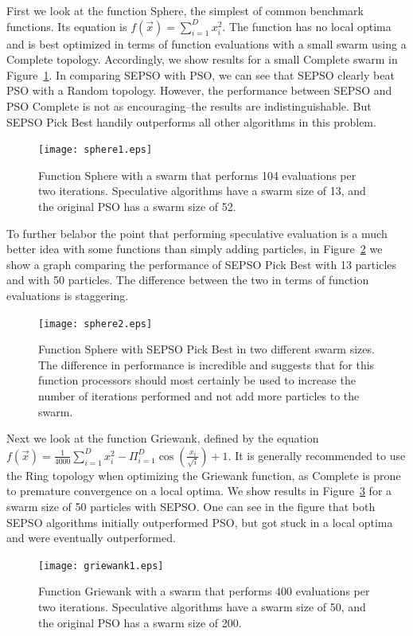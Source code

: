 \documentclass[conference,letterpaper]{IEEEtran}
\newcommand{\fig}[1]{Figure~\ref{fig:#1}}
\begin{document}
First we look at the function Sphere, the simplest of common benchmark
functions.  Its equation is $f(\Vec{x}) = \sum_{i=1}^D x_i^2$.  The function
has no local optima and is best optimized in terms of function evaluations with
a small swarm using a Complete topology.  Accordingly, we show results for a
small Complete swarm in \fig{sphere1}.  In comparing SEPSO with PSO, we can see
that SEPSO clearly beat PSO with a Random topology.  However, the performance
between SEPSO and PSO Complete is not as encouraging--the results are
indistinguishable.  But SEPSO Pick Best handily outperforms all other
algorithms in this problem.

\begin{figure}
  \texttt{[image: sphere1.eps]}
  \caption{Function Sphere with a swarm that performs 104 evaluations per two
  iterations.  Speculative algorithms have a swarm size of 13, and the original
  PSO has a swarm size of 52.}
  \label{fig:sphere1}
\end{figure}

To further belabor the point that performing speculative evaluation is a much
better idea with some functions than simply adding particles, in \fig{sphere2}
we show a graph comparing the performance of SEPSO Pick Best with 13 particles
and with 50 particles.  The difference between the two in terms of function
evaluations is staggering.

\begin{figure}
  \texttt{[image: sphere2.eps]}
  \caption{Function Sphere with SEPSO Pick Best in two different swarm sizes.
  The difference in performance is incredible and suggests that for this
  function processors should most certainly be used to increase the number of
  iterations performed and not add more particles to the swarm.}
  \label{fig:sphere2}
\end{figure}

Next we look at the function Griewank, defined by the equation $f(\Vec{x}) =
\frac{1}{4000} \sum_{i=1}^D x_i^2 - \Pi_{i=1}^D \cos\left(\frac{x_i}{\sqrt{i}}
\right) + 1$.  It is generally recommended to use the Ring topology when
optimizing the Griewank function, as Complete is prone to premature convergence
on a local optima.  We show results in \fig{griewank1} for a swarm size of 50
particles with SEPSO.  One can see in the figure that both SEPSO algorithms
initially outperformed PSO, but got stuck in a local optima and were eventually
outperformed.  

\begin{figure}
  \texttt{[image: griewank1.eps]}
  \caption{Function Griewank with a swarm that performs 400 evaluations per two
  iterations.  Speculative algorithms have a swarm size of 50, and the original
  PSO has a swarm size of 200.}
  \label{fig:griewank1}
\end{figure}
\end{document}

